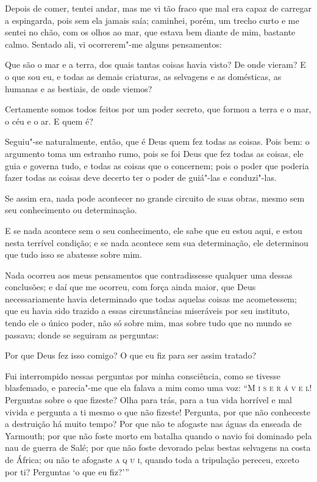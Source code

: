 Depois de comer, tentei andar, mas me vi tão fraco que mal era capaz de
carregar a espingarda, pois sem ela jamais saía; caminhei, porém, um
trecho curto e me sentei no chão, com os olhos ao mar, que estava bem
diante de mim, bastante calmo. Sentado ali, vi ocorrerem"-me alguns
pensamentos:

Que são o mar e a terra, dos quais tantas coisas havia visto? De onde
vieram? E o que sou eu, e todas as demais criaturas, as selvagens e as
domésticas, as humanas e as bestiais, de onde viemos?

Certamente somos todos feitos por um poder secreto, que formou a terra e
o mar, o céu e o ar. E quem é?

Seguiu"-se naturalmente, então, que é Deus quem fez todas as coisas. Pois
bem: o argumento toma um estranho rumo, pois se foi Deus que fez todas
as coisas, ele guia e governa tudo, e todas as coisas que o concernem;
pois o poder que poderia fazer todas as coisas deve decerto ter o poder
de guiá"-las e conduzi"-las.

Se assim era, nada pode acontecer no grande circuito de suas obras,
mesmo sem seu conhecimento ou determinação.

E se nada acontece sem o seu conhecimento, ele sabe que eu estou aqui, e
estou nesta terrível condição; e se nada acontece sem sua determinação,
ele determinou que tudo isso se abatesse sobre mim.

Nada ocorreu aos meus pensamentos que contradissesse qualquer uma dessas
conclusões; e daí que me ocorreu, com força ainda maior, que Deus
necessariamente havia determinado que todas aquelas coisas me
acometessem; que eu havia sido trazido a essas circunstâncias miseráveis
por seu instituto, tendo ele o único poder, não só sobre mim, mas sobre
tudo que no mundo se passava; donde se seguiram as perguntas:

Por que Deus fez isso comigo? O que eu fiz para ser assim tratado?

Fui interrompido nessas perguntas por minha consciência, como se tivesse
blasfemado, e parecia"-me que ela falava a mim como uma voz: ``\textsc{M
i s e r á v e l}! Perguntas sobre o que fizeste? Olha para trás, para a
tua vida horrível e mal vivida e pergunta a ti mesmo o que não fizeste!
Pergunta, por que não conheceste a destruição há muito tempo? Por que
não te afogaste nas águas da enseada de Yarmouth; por que não foste
morto em batalha quando o navio foi dominado pela nau de guerra de Salé;
por que não foste devorado pelas bestas selvagens na costa de África; ou
não te afogaste \textsc{a q u i}, quando toda a tripulação pereceu,
exceto por ti? Perguntas `o que eu fiz?'''

